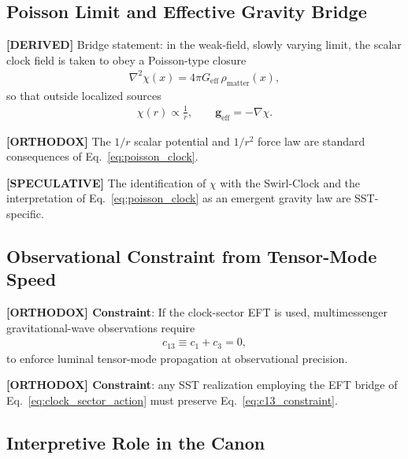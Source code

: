\documentclass[11pt]{article}
\theoremstyle{definition}
\theoremstyle{plain}
\theoremstyle{remark}
\begin{document}
    \subsection{Poisson Limit and Effective Gravity Bridge}

        \textbf{[DERIVED]} Bridge statement: in the weak-field, slowly varying limit, the scalar clock field is taken to obey
        a Poisson-type closure
        \begin{align}
            \nabla^2 \chi(x)
            =
            4\pi G_{\mathrm{eff}} \,\rho_{\mathrm{matter}}(x),
            \label{eq:poisson_clock}
        \end{align}
        so that outside localized sources
        \begin{align}
            \chi(r) \propto \frac{1}{r},
            \qquad
            \mathbf{g}_{\mathrm{eff}} = - \nabla \chi.
            \label{eq:effective_gravity_clock}
        \end{align}

        \textbf{[ORTHODOX]} The \(1/r\) scalar potential and \(1/r^2\) force law are standard consequences of
        Eq.~\eqref{eq:poisson_clock}.

        \textbf{[SPECULATIVE]} The identification of \(\chi\) with the Swirl-Clock and the interpretation of
        Eq.~\eqref{eq:poisson_clock} as an emergent gravity law are SST-specific.

    \subsection{Observational Constraint from Tensor-Mode Speed}

        \textbf{[ORTHODOX] Constraint}: If the clock-sector EFT is used, multimessenger gravitational-wave
        observations require \cite{Monitor2017}
        \begin{align}
            c_{13} \equiv c_1 + c_3 = 0,
            \label{eq:c13_constraint}
        \end{align}
        to enforce luminal tensor-mode propagation at observational precision.

        \textbf{[ORTHODOX] Constraint}: any SST realization employing the EFT bridge of Eq.~\eqref{eq:clock_sector_action}
        must preserve Eq.~\eqref{eq:c13_constraint}.

    \subsection{Interpretive Role in the Canon}
\end{document}
